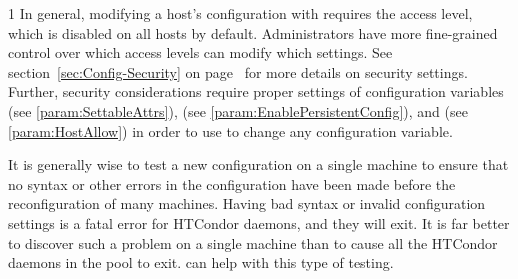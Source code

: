 \begin{ManPage}{\label{man-condor-config-val}}{1}
In general, modifying a host's configuration with
requires the  access level, which is disabled on all
hosts by default.
Administrators have more
fine-grained control over which access levels can modify which
settings.
See section~\ref{sec:Config-Security} on
page~\pageref{sec:Config-Security} for more details on security settings.
Further, security considerations require proper settings of
configuration variables
 (see \ref{param:SettableAttrs}),
 (see \ref{param:EnablePersistentConfig}),
and  (see \ref{param:HostAllow})
in order to use  to change any configuration variable.

It is generally wise to test a new configuration on a single
machine to ensure that no syntax or other errors in the
configuration have been made before the reconfiguration of many machines.  
Having bad syntax or invalid configuration settings is a fatal error
for HTCondor daemons, and they will exit.
It is far better to discover such a problem on a single machine than to
cause all the HTCondor daemons in the pool to exit.
 can help with this type of testing.


\end{ManPage}
